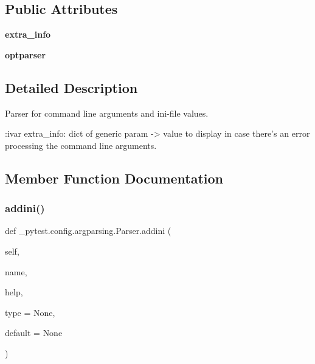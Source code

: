 \subsection*{Public Attributes}
\begin{DoxyCompactItemize}
\item 
\mbox{\label{class__pytest_1_1config_1_1argparsing_1_1_parser_a6587a6ba41866671ad2f1b20028975d8}} 
{\bfseries extra\+\_\+info}
\item 
\mbox{\label{class__pytest_1_1config_1_1argparsing_1_1_parser_aa02693a90885e25415ddfde9807aa5ec}} 
{\bfseries optparser}
\end{DoxyCompactItemize}


\subsection{Detailed Description}
\begin{DoxyVerb}Parser for command line arguments and ini-file values.

:ivar extra_info: dict of generic param -> value to display in case
    there's an error processing the command line arguments.
\end{DoxyVerb}
 

\subsection{Member Function Documentation}
\mbox{\label{class__pytest_1_1config_1_1argparsing_1_1_parser_a5896682707d2ca72364b05c1d7a99cec}} 
\subsubsection{\texorpdfstring{addini()}{addini()}}
{\footnotesize\ttfamily def \+\_\+pytest.\+config.\+argparsing.\+Parser.\+addini (\begin{DoxyParamCaption}\item[{}]{self,  }\item[{}]{name,  }\item[{}]{help,  }\item[{}]{type = {\ttfamily None},  }\item[{}]{default = {\ttfamily None} }\end{DoxyParamCaption})}

